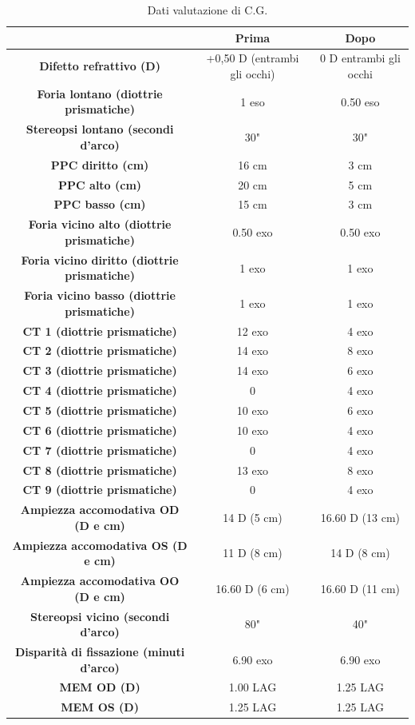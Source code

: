\begin{table}[H]
\begin{center}
\begin{tabular}{|c|c|c|} \hline
{\textbf{}} & {\textbf{Prima}} & {\textbf{Dopo}}\\ \hline
\textbf{Difetto refrattivo (D)} & +0,50 D (entrambi gli occhi) & 0 D entrambi gli occhi \\ \hline
\textbf{Foria lontano (diottrie prismatiche)} & 1 eso & 0.50 eso \\ \hline
\textbf{Stereopsi lontano (secondi d'arco)} & 30" & 30" \\ \hline
\textbf{PPC diritto (cm)} & 16 cm & 3 cm \\ \hline
\textbf{PPC alto (cm)} & 20 cm & 5 cm \\ \hline
\textbf{PPC basso (cm)} & 15 cm & 3 cm\\ \hline
\textbf{Foria vicino alto (diottrie prismatiche)} & 0.50 exo & 0.50 exo \\ \hline
\textbf{Foria vicino diritto (diottrie prismatiche)} & 1 exo & 1 exo \\ \hline
\textbf{Foria vicino basso (diottrie prismatiche)} & 1 exo & 1 exo \\ \hline
\textbf{CT 1 (diottrie prismatiche)} & 12 exo & 4 exo \\ \hline
\textbf{CT 2 (diottrie prismatiche)} & 14 exo & 8 exo \\ \hline
\textbf{CT 3 (diottrie prismatiche)} & 14 exo & 6 exo \\ \hline
\textbf{CT 4 (diottrie prismatiche)} & 0 & 4 exo \\ \hline
\textbf{CT 5 (diottrie prismatiche)} & 10 exo & 6 exo \\ \hline
\textbf{CT 6 (diottrie prismatiche)} & 10 exo & 4 exo \\ \hline
\textbf{CT 7 (diottrie prismatiche)} & 0 & 4 exo \\ \hline
\textbf{CT 8 (diottrie prismatiche)} & 13 exo & 8 exo \\ \hline
\textbf{CT 9 (diottrie prismatiche)} & 0 & 4 exo \\ \hline
\textbf{Ampiezza accomodativa OD (D e cm)} & 14 D (5 cm) & 16.60 D (13 cm)\\ \hline
\textbf{Ampiezza accomodativa OS (D e cm)} & 11 D (8 cm) & 14 D (8 cm)\\ \hline
\textbf{Ampiezza accomodativa OO (D e cm)} & 16.60 D (6 cm) & 16.60 D (11 cm) \\ \hline
\textbf{Stereopsi vicino (secondi d'arco)} & 80" & 40" \\ \hline
\textbf{Disparità di fissazione (minuti d'arco)} & 6.90 exo & 6.90 exo\\ \hline
\textbf{MEM OD (D)} & 1.00 LAG  & 1.25 LAG \\ \hline
\textbf{MEM OS (D)} & 1.25 LAG & 1.25 LAG\\ \hline

\hline
\end{tabular}
\end{center}
\caption{Dati valutazione di C.G.}
\end{table}

